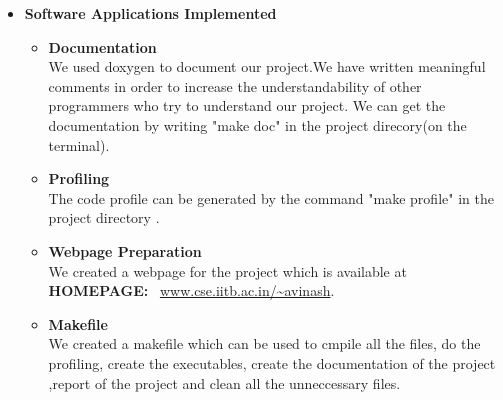 \documentclass{article}
\begin{document}
\begin{itemize}
	\item[] \textbf{\LARGE Software Applications Implemented} \\
        \begin{itemize}[label=$\blacksquare$] \vspace{0cm}

            \item \textbf{\Large Documentation }\\
            \large We used doxygen to document our project.We have written meaningful comments in order to increase the understandability of other programmers who try to understand our project. We can get the documentation by writing "make doc" in the project direcory(on the terminal). \vspace{0.60 cm}

            \item \textbf{\Large Profiling}\\ 
            \large The code profile can be generated by the command "make profile" in the project directory . \vspace{0.60 cm}

            \item \textbf{\Large Webpage Preparation}\\ 
            \large We created a webpage for the project which is available at {\large {\bf HOMEPAGE:} \ \url{www.cse.iitb.ac.in/~avinash}}. \vspace{0.60 cm}

            \item \textbf{\Large Makefile}\\ 
            \large We created a makefile which can be used to cmpile all the files, do the profiling, create the executables, create the documentation of the project ,report of the project and clean all the unneccessary files. \vspace{0.60 cm}


 \end{itemize}
        \end{itemize}
    \clearpage
\end{document}
